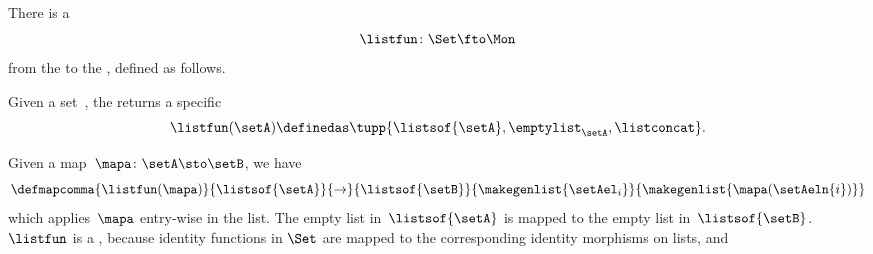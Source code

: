 \begin{example}
    There is a 
    \begin{equation}\label{eq:list-functor-intro}
        \listfun\colon \Set \fto \Mon
    \end{equation}
    from the  to the , defined as follows.

    Given a set~\setA, the  returns a specific 
    \begin{equation}\label{eq:list-functor-on-objects}
        \listfun(\setA)\definedas\tupp{\listsof{\setA},\emptylist_\setA, \listconcat}.
    \end{equation}

    Given a map~$\mapa\colon \setA \sto \setB$, we have
    \begin{equation}\label{eq:list-functor-on-morphisms}
        \defmapcomma{
            \listfun(\mapa)
        }{
            \listsof{\setA}
        }{
            \to
        }{
            \listsof{\setB}
        }{
            \makegenlist{ \setAel_i }
        }{
            \makegenlist{ \mapa(\setAeln{i}) }
        }
    \end{equation}
    which applies~$\mapa$ entry-wise in the list.
    The empty list in~$\listsof{\setA}$ is mapped to the empty list in~$\listsof{\setB}$.
        {}
    $\listfun$ is a , because identity functions in $\Set$ are mapped to the corresponding identity morphisms on lists, and

\end{example}
